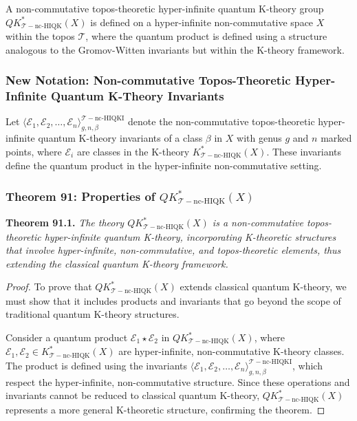 \documentclass{article}
\begin{document}
A non-commutative topos-theoretic hyper-infinite quantum K-theory group \(QK_{\mathcal{T}-\text{nc-HIQK}}^{*}(X)\) is defined on a hyper-infinite non-commutative space \(X\) within the topos \(\mathcal{T}\), where the quantum product is defined using a structure analogous to the Gromov-Witten invariants but within the K-theory framework.

\subsubsection{New Notation: Non-commutative Topos-Theoretic Hyper-Infinite Quantum K-Theory Invariants}
Let \(\langle \mathcal{E}_1, \mathcal{E}_2, \dots, \mathcal{E}_n \rangle^{\mathcal{T}-\text{nc-HIQKI}}_{g, n, \beta}\) denote the non-commutative topos-theoretic hyper-infinite quantum K-theory invariants of a class \(\beta\) in \(X\) with genus \(g\) and \(n\) marked points, where \(\mathcal{E}_i\) are classes in the K-theory \(K_{\mathcal{T}-\text{nc-HIQK}}^{*}(X)\). These invariants define the quantum product in the hyper-infinite non-commutative setting.

\subsubsection{Theorem 91: Properties of \(QK_{\mathcal{T}-\text{nc-HIQK}}^{*}(X)\)}
\textbf{Theorem 91.1.} \textit{The theory \(QK_{\mathcal{T}-\text{nc-HIQK}}^{*}(X)\) is a non-commutative topos-theoretic hyper-infinite quantum K-theory, incorporating K-theoretic structures that involve hyper-infinite, non-commutative, and topos-theoretic elements, thus extending the classical quantum K-theory framework.}

\begin{proof}
To prove that \(QK_{\mathcal{T}-\text{nc-HIQK}}^{*}(X)\) extends classical quantum K-theory, we must show that it includes products and invariants that go beyond the scope of traditional quantum K-theory structures.

Consider a quantum product \(\mathcal{E}_1 \star \mathcal{E}_2\) in \(QK_{\mathcal{T}-\text{nc-HIQK}}^{*}(X)\), where \(\mathcal{E}_1, \mathcal{E}_2 \in K_{\mathcal{T}-\text{nc-HIQK}}^{*}(X)\) are hyper-infinite, non-commutative K-theory classes. The product is defined using the invariants \(\langle \mathcal{E}_1, \mathcal{E}_2, \dots, \mathcal{E}_n \rangle^{\mathcal{T}-\text{nc-HIQKI}}_{g, n, \beta}\), which respect the hyper-infinite, non-commutative structure. Since these operations and invariants cannot be reduced to classical quantum K-theory, \(QK_{\mathcal{T}-\text{nc-HIQK}}^{*}(X)\) represents a more general K-theoretic structure, confirming the theorem.
\end{proof}
\end{document}
